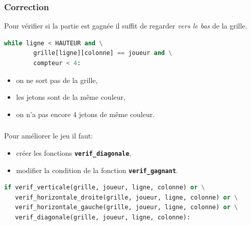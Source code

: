\documentclass[svgnames,11pt]{beamer}
\begin{document}
\begin{frame}[fragile]
    \frametitle{Correction}
\begin{aretenir}[Remarque]
Pour vérifier si la partie est gagnée il suffit de regarder \emph{vers le bas} de la grille.
\end{aretenir}
    \begin{center}
    \begin{lstlisting}[language=Python , basicstyle=\ttfamily\small, xleftmargin=2em, xrightmargin=1em]
while ligne < HAUTEUR and \
        grille[ligne][colonne] == joueur and \
        compteur < 4:
\end{lstlisting}
    \end{center}
\begin{itemize}
    \item on ne sort pas de la grille,
    \item les jetons sont de la même couleur,
    \item on n'a pas encore 4 jetons de même couleur.
\end{itemize}
\end{frame}
\begin{frame}[fragile]
    \frametitle{}

    Pour améliorer le jeu il faut:
    \begin{itemize}
        \item créer les fonctions \textbf{\texttt{verif\_diagonale}},
        \item modifier la condition de la fonction \textbf{\texttt{verif\_gagnant}}.
    \end{itemize}
    \begin{center}
    \begin{lstlisting}[language=Python , basicstyle=\ttfamily\small, xleftmargin=.3em, xrightmargin=-6.3em]
if verif_verticale(grille, joueur, ligne, colonne) or \
   verif_horizontale_droite(grille, joueur, ligne, colonne) or \
   verif_horizontale_gauche(grille, joueur, ligne, colonne) or \
   verif_diagonale(grille, joueur, ligne, colonne):
\end{lstlisting}
        \end{center}
\end{frame}
\end{document}
